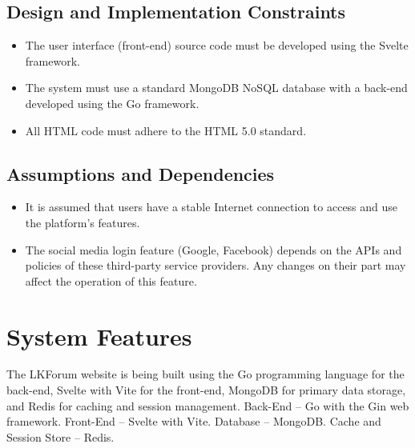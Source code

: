 \documentclass{scrreprt}
\begin{document}
\section{Design and Implementation Constraints}

\begin{itemize}[leftmargin=2cm]
    \item[\textbf{CO-1:}] The user interface (front-end) source code must be developed using the Svelte framework.

    \item[\textbf{CO-2:}] The system must use a standard MongoDB NoSQL database with a back-end developed using the Go framework.

    \item[\textbf{CO-3:}] All HTML code must adhere to the HTML 5.0 standard.
\end{itemize}

\section{Assumptions and Dependencies}

\begin{itemize}[leftmargin=2cm]
    \item[\textbf{AS-1:}] It is assumed that users have a stable Internet connection to access and use the platform's features.

    \item[\textbf{DE-1:}] The social media login feature (Google, Facebook) depends on the APIs and policies of these third-party service providers. Any changes on their part may affect the operation of this feature.
\end{itemize}

\chapter{System Features}

The LKForum website is being built using the Go programming language for the back-end, Svelte with Vite for the front-end, MongoDB for primary data storage, and Redis for caching and session management.
\newline
Back-End -- Go with the Gin web framework.
\newline
Front-End -- Svelte with Vite.
\newline
Database -- MongoDB.
\newline
Cache and Session Store -- Redis.
\end{document}
